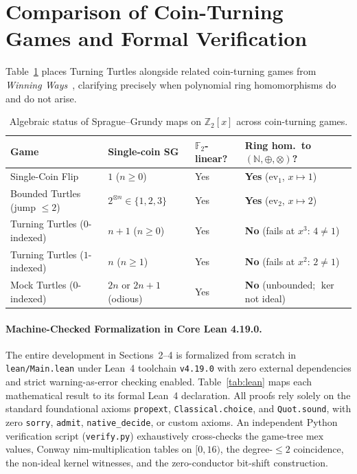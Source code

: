 \documentclass[11pt,a4paper]{article}
\theoremstyle{definition}
\newcommand{\F}{\mathbb{F}}
\newcommand{\Z}{\mathbb{Z}}
\newcommand{\N}{\mathbb{N}}
\newcommand{\mex}{\mathrm{mex}}
\newcommand{\ev}{\mathrm{ev}}
\begin{document}
\section{Comparison of Coin-Turning Games and Formal Verification}

Table~\ref{tab:games} places Turning Turtles alongside related coin-turning games from
\emph{Winning Ways}~\cite{WW}, clarifying precisely when polynomial ring homomorphisms do
and do not arise.

\begin{table}[ht]
\centering
\caption{Algebraic status of Sprague--Grundy maps on $\Z_2[x]$ across coin-turning games.}
\label{tab:games}
\medskip
{\small
\begin{tabular}{llll}
\hline
Game & Single-coin SG & $\F_2$-linear? & Ring hom.\ to $(\N,\oplus,\otimes)$? \\
\hline
Single-Coin Flip & $1$ ($n \ge 0$) & Yes & \textbf{Yes} ($\ev_1$, $x \mapsto 1$) \\
Bounded Turtles (jump $\le 2$) & $2^{\otimes n} \in \{1,2,3\}$ & Yes & \textbf{Yes} ($\ev_2$, $x \mapsto 2$) \\
Turning Turtles ($0$-indexed) & $n + 1$ ($n \ge 0$) & Yes & \textbf{No} (fails at $x^3$: $4 \neq 1$) \\
Turning Turtles ($1$-indexed) & $n$ ($n \ge 1$) & Yes & \textbf{No} (fails at $x^2$: $2 \neq 1$) \\
Mock Turtles ($0$-indexed) & $2n$ or $2n{+}1$ (odious) & Yes & \textbf{No} (unbounded; $\ker$ not ideal) \\
\hline
\end{tabular}
}
\end{table}

\paragraph{Machine-Checked Formalization in Core Lean 4.19.0.}
The entire development in Sections~2--4 is formalized from scratch in
\texttt{lean/Main.lean} under Lean~4 toolchain \texttt{v4.19.0} with zero external
dependencies and strict warning-as-error checking enabled. Table~\ref{tab:lean} maps each
mathematical result to its formal Lean~4 declaration. All proofs rely solely on the standard
foundational axioms \texttt{propext}, \texttt{Classical.choice}, and \texttt{Quot.sound},
with zero \texttt{sorry}, \texttt{admit}, \texttt{native\_decide}, or custom axioms. An
independent Python verification script (\texttt{verify.py}) exhaustively cross-checks the
game-tree $\mex$ values, Conway nim-multiplication tables on $[0,16)$, the degree-$\le 2$
coincidence, the non-ideal kernel witnesses, and the zero-conductor bit-shift construction.
\end{document}
